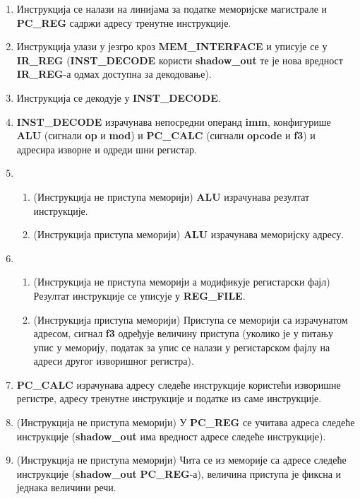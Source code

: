 \begin{enumerate}
	\item Инструкција се налази на линијама за податке меморијске магистрале и \textbf{PC\_REG} садржи адресу тренутне инструкције. \label{itemone}
	\item Инструкција улази у језгро кроз \textbf{MEM\_INTERFACE} и уписује се у \textbf{IR\_REG} (\textbf{INST\_DECODE} користи \textbf{shadow\_out} те је нова вредност \textbf{IR\_REG}-а одмах доступна за декодовање).
	\item Инструкција се декодује у \textbf{INST\_DECODE}.
	\item \textbf{INST\_DECODE} израчунава непосредни операнд \textbf{imm}, конфигурише \textbf{ALU} (сигнали \textbf{op} и \textbf{mod}) и \textbf{PC\_CALC} (сигнали \textbf{opcode} и \textbf{f3}) и адресира изворне и одреди шни регистар.
	\item
	\begin{enumerate}	
	\item (Инструкција не приступа меморији) \textbf{ALU} израчунава резултат инструкције.
	\item (Инструкција приступа меморији) \textbf{ALU} израчунава меморијску адресу.
	\end{enumerate}
	\item
	\begin{enumerate}
	\item (Инструкција не приступа меморији а модификује регистарски фајл) Резултат инструкције се уписује у \textbf{REG\_FILE}.
	\item (Инструкција приступа меморији) Приступа се меморији са израчунатом адресом, сигнал \textbf{f3} одређује величину приступа (уколико је у питању упис у меморију, податак за упис се налази у регистарском фајлу на адреси другог изворишног регистра).
	\end{enumerate}
	\item \textbf{PC\_CALC} израчунава адресу следеће инструкције користећи изворишне регистре, адресу тренутне инструкције и податке из саме инструкције.
	\item (Инструкција не приступа меморији) У \textbf{PC\_REG} се учитава адреса следеће инструкције (\textbf{shadow\_out} има вредност адресе следеће инструкције).
	\item (Инструкција не приступа меморији) Чита се из меморије са адресе следеће инструкције (\textbf{shadow\_out} \textbf{PC\_REG}-а), величина приступа је фиксна и једнака величини речи.
\end{enumerate}

